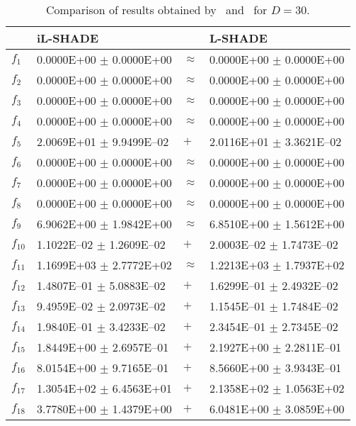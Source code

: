 \begin{table}[ht]
\centering
\caption{Comparison of results obtained by {\sf \ilshade}\ and {\sf \LSHADE}\ for $D=30$.} 
\label{tab:D30}
\begin{tabular}{|l|ll|l|}
  \hline
 & iL-SHADE &  & L-SHADE \\ 
  \hline \hline
$f_{1}$ & 0.0000E+00 $\pm$ 0.0000E+00 & $\approx$ & 0.0000E+00 $\pm$ 0.0000E+00 \\ 
  $f_{2}$ & 0.0000E+00 $\pm$ 0.0000E+00 & $\approx$ & 0.0000E+00 $\pm$ 0.0000E+00 \\ 
  $f_{3}$ & 0.0000E+00 $\pm$ 0.0000E+00 & $\approx$ & 0.0000E+00 $\pm$ 0.0000E+00 \\ 
  $f_{4}$ & 0.0000E+00 $\pm$ 0.0000E+00 & $\approx$ & 0.0000E+00 $\pm$ 0.0000E+00 \\ 
  $f_{5}$ & 2.0069E+01 $\pm$ 9.9499E--02 & $+$ & 2.0116E+01 $\pm$ 3.3621E--02 \\ 
  $f_{6}$ & 0.0000E+00 $\pm$ 0.0000E+00 & $\approx$ & 0.0000E+00 $\pm$ 0.0000E+00 \\ 
  $f_{7}$ & 0.0000E+00 $\pm$ 0.0000E+00 & $\approx$ & 0.0000E+00 $\pm$ 0.0000E+00 \\ 
  $f_{8}$ & 0.0000E+00 $\pm$ 0.0000E+00 & $\approx$ & 0.0000E+00 $\pm$ 0.0000E+00 \\ 
  $f_{9}$ & 6.9062E+00 $\pm$ 1.9842E+00 & $\approx$ & 6.8510E+00 $\pm$ 1.5612E+00 \\ 
  $f_{10}$ & 1.1022E--02 $\pm$ 1.2609E--02 & $+$ & 2.0003E--02 $\pm$ 1.7473E--02 \\ 
  $f_{11}$ & 1.1699E+03 $\pm$ 2.7772E+02 & $\approx$ & 1.2213E+03 $\pm$ 1.7937E+02 \\ 
  $f_{12}$ & 1.4807E--01 $\pm$ 5.0883E--02 & $+$ & 1.6299E--01 $\pm$ 2.4932E--02 \\ 
  $f_{13}$ & 9.4959E--02 $\pm$ 2.0973E--02 & $+$ & 1.1545E--01 $\pm$ 1.7484E--02 \\ 
  $f_{14}$ & 1.9840E--01 $\pm$ 3.4233E--02 & $+$ & 2.3454E--01 $\pm$ 2.7345E--02 \\ 
  $f_{15}$ & 1.8449E+00 $\pm$ 2.6957E--01 & $+$ & 2.1927E+00 $\pm$ 2.2811E--01 \\ 
  $f_{16}$ & 8.0154E+00 $\pm$ 9.7165E--01 & $+$ & 8.5660E+00 $\pm$ 3.9343E--01 \\ 
  $f_{17}$ & 1.3054E+02 $\pm$ 6.4563E+01 & $+$ & 2.1358E+02 $\pm$ 1.0563E+02 \\ 
  $f_{18}$ & 3.7780E+00 $\pm$ 1.4379E+00 & $+$ & 6.0481E+00 $\pm$ 3.0859E+00 \\ 

\end{tabular}
\end{table}
